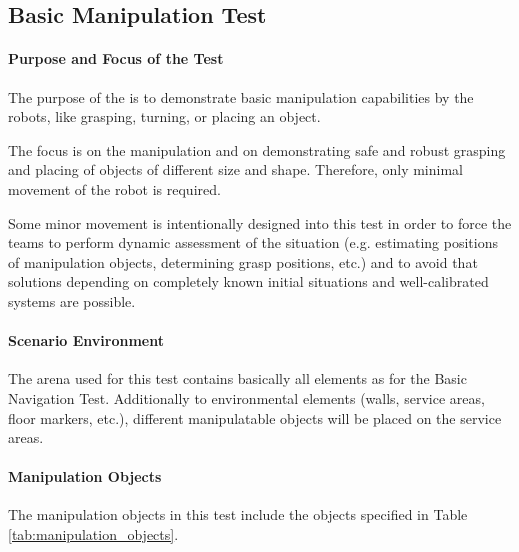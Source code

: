 \newpage
\subsection{Basic Manipulation Test}

\paragraph{Purpose and Focus of the Test}
The purpose of the  is to demonstrate basic manipulation capabilities by the robots, like grasping, turning, or placing an object.
\par
The focus is on the manipulation and on demonstrating safe and robust grasping and placing of objects of different size and shape. Therefore, only minimal movement of the robot is required.
\par
Some minor movement is intentionally designed into this test in order to force the teams to perform dynamic assessment of the situation (e.g. estimating positions of manipulation objects, determining grasp positions, etc.) and to avoid that solutions depending on completely known initial situations and well-calibrated systems are possible.

\paragraph{Scenario Environment}
The arena used for this test contains basically all elements as for the Basic Navigation Test. Additionally to environmental elements (walls, service areas, floor markers, etc.), different manipulatable objects will be placed on the service areas.

\paragraph{Manipulation Objects}
The manipulation objects in this test include the objects specified in Table \ref{tab:manipulation_objects}.

